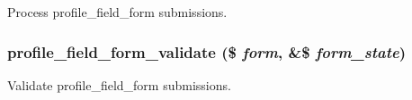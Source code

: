 \label{profile_8admin_8inc_a25efcaa4c4b8e9dc9568622ad0ab3411}
Process profile\_\-field\_\-form submissions. \hypertarget{profile_8admin_8inc_a68cc1dfe2c4f0e0946ede9786b4554e2}{
\subsubsection[{profile\_\-field\_\-form\_\-validate}]{\setlength{\rightskip}{0pt plus 5cm}profile\_\-field\_\-form\_\-validate (\$ {\em form}, \/  \&\$ {\em form\_\-state})}}
\label{profile_8admin_8inc_a68cc1dfe2c4f0e0946ede9786b4554e2}
Validate profile\_\-field\_\-form submissions. 